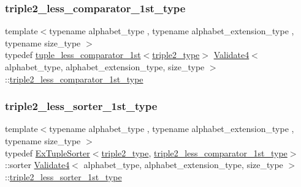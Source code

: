 \subsubsection{\texorpdfstring{triple2\+\_\+less\+\_\+comparator\+\_\+1st\+\_\+type}{triple2\_less\_comparator\_1st\_type}}
{\footnotesize\ttfamily template$<$typename alphabet\+\_\+type , typename alphabet\+\_\+extension\+\_\+type , typename size\+\_\+type $>$ \\
typedef \hyperlink{structtuple__less__comparator__1st}{tuple\+\_\+less\+\_\+comparator\+\_\+1st}$<$\hyperlink{class_validate4_a1e1065b2bd86208beeec8aea6edd3ddd}{triple2\+\_\+type}$>$ \hyperlink{class_validate4}{Validate4}$<$ alphabet\+\_\+type, alphabet\+\_\+extension\+\_\+type, size\+\_\+type $>$\+::\hyperlink{class_validate4_a83e9e52347608368b088892cabbdc8c5}{triple2\+\_\+less\+\_\+comparator\+\_\+1st\+\_\+type}\hspace{0.3cm}{\ttfamily [private]}}

\mbox{\label{class_validate4_a4c1bcea817e34f96d95c99e0694bbfc8}} 
\subsubsection{\texorpdfstring{triple2\+\_\+less\+\_\+sorter\+\_\+1st\+\_\+type}{triple2\_less\_sorter\_1st\_type}}
{\footnotesize\ttfamily template$<$typename alphabet\+\_\+type , typename alphabet\+\_\+extension\+\_\+type , typename size\+\_\+type $>$ \\
typedef \hyperlink{struct_ex_tuple_sorter}{Ex\+Tuple\+Sorter}$<$\hyperlink{class_validate4_a1e1065b2bd86208beeec8aea6edd3ddd}{triple2\+\_\+type}, \hyperlink{class_validate4_a83e9e52347608368b088892cabbdc8c5}{triple2\+\_\+less\+\_\+comparator\+\_\+1st\+\_\+type}$>$\+::sorter \hyperlink{class_validate4}{Validate4}$<$ alphabet\+\_\+type, alphabet\+\_\+extension\+\_\+type, size\+\_\+type $>$\+::\hyperlink{class_validate4_a4c1bcea817e34f96d95c99e0694bbfc8}{triple2\+\_\+less\+\_\+sorter\+\_\+1st\+\_\+type}\hspace{0.3cm}{\ttfamily [private]}}

\mbox{\label{class_validate4_a1e1065b2bd86208beeec8aea6edd3ddd}} 
